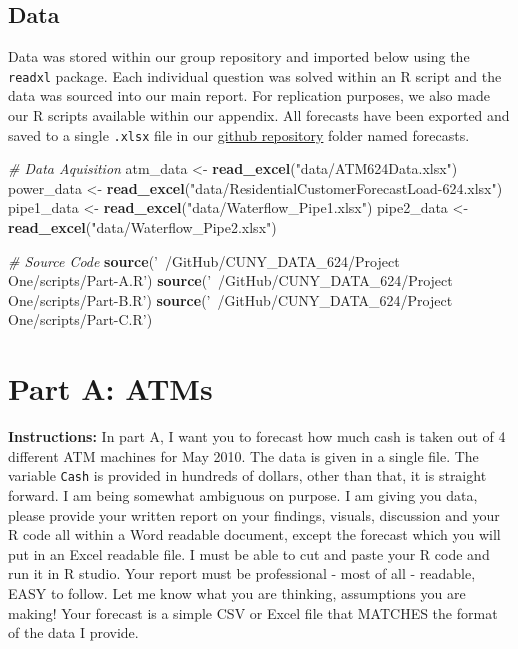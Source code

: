 \documentclass[openany]{book}
\newenvironment{Shaded}{\begin{snugshade}}{\end{snugshade}}
\newcommand{\CommentTok}[1]{\textcolor[rgb]{0.56,0.35,0.01}{\textit{#1}}}
\newcommand{\KeywordTok}[1]{\textcolor[rgb]{0.13,0.29,0.53}{\textbf{#1}}}
\newcommand{\NormalTok}[1]{#1}
\newcommand{\StringTok}[1]{\textcolor[rgb]{0.31,0.60,0.02}{#1}}
\renewenvironment{quote}{\begin{myquote}}{\end{myquote}}
\begin{document}
\hypertarget{data}{%
\section*{Data}\label{data}}

Data was stored within our group repository and imported below using the
\texttt{readxl} package. Each individual question was solved within an R
script and the data was sourced into our main report. For replication
purposes, we also made our R scripts available within our appendix. All
forecasts have been exported and saved to a single \texttt{.xlsx} file
in our
\href{https://github.com/JeremyOBrien16/CUNY_DATA_624/tree/master/Project\%20One/}{github
repository} folder named forecasts.

\begin{Shaded}
\begin{Highlighting}[]
\CommentTok{# Data Aquisition}
\NormalTok{atm_data <-}\StringTok{ }\KeywordTok{read_excel}\NormalTok{(}\StringTok{"data/ATM624Data.xlsx"}\NormalTok{) }
\NormalTok{power_data <-}\StringTok{ }\KeywordTok{read_excel}\NormalTok{(}\StringTok{"data/ResidentialCustomerForecastLoad-624.xlsx"}\NormalTok{) }
\NormalTok{pipe1_data <-}\StringTok{ }\KeywordTok{read_excel}\NormalTok{(}\StringTok{"data/Waterflow_Pipe1.xlsx"}\NormalTok{)}
\NormalTok{pipe2_data <-}\StringTok{ }\KeywordTok{read_excel}\NormalTok{(}\StringTok{"data/Waterflow_Pipe2.xlsx"}\NormalTok{)}

\CommentTok{# Source Code}
\KeywordTok{source}\NormalTok{(}\StringTok{'~/GitHub/CUNY_DATA_624/Project One/scripts/Part-A.R'}\NormalTok{)}
\KeywordTok{source}\NormalTok{(}\StringTok{'~/GitHub/CUNY_DATA_624/Project One/scripts/Part-B.R'}\NormalTok{)}
\KeywordTok{source}\NormalTok{(}\StringTok{'~/GitHub/CUNY_DATA_624/Project One/scripts/Part-C.R'}\NormalTok{)}
\end{Highlighting}
\end{Shaded}

\hypertarget{part-a-atms}{%
\chapter{Part A: ATMs}\label{part-a-atms}}

\begin{quote}
\textbf{Instructions:} In part A, I want you to forecast how much cash
is taken out of 4 different ATM machines for May 2010. The data is given
in a single file. The variable \texttt{Cash} is provided in hundreds of
dollars, other than that, it is straight forward. I am being somewhat
ambiguous on purpose. I am giving you data, please provide your written
report on your findings, visuals, discussion and your R code all within
a Word readable document, except the forecast which you will put in an
Excel readable file. I must be able to cut and paste your R code and run
it in R studio. Your report must be professional - most of all -
readable, EASY to follow. Let me know what you are thinking, assumptions
you are making! Your forecast is a simple CSV or Excel file that MATCHES
the format of the data I provide.
\end{quote}
\end{document}
